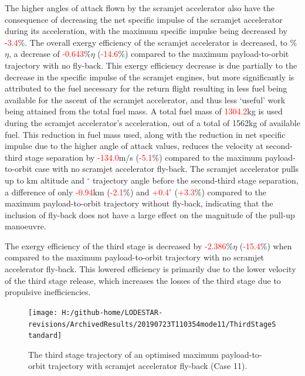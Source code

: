 The higher angles of attack flown by the scramjet accelerator also have the consequence of decreasing the net specific impulse of the scramjet accelerator during its acceleration, with the maximum specific impulse being decreased by -\textcolor{red}{3.4}\%.
The overall exergy efficiency of the scramjet accelerator is decreased, to \secondExergyEffStandard\%$\eta$, a decrease of \textcolor{red}{-0.643}\%$\eta$ (\textcolor{red}{-14.6}\%) compared to the maximum payload-to-orbit trajectory with no fly-back. This exergy efficiency decrease is due partially to the decrease in the specific impulse of the scramjet engines, but more significantly is attributed to the fuel necessary for the return flight resulting in less fuel being available for the ascent of the scramjet accelerator, and thus less `useful' work being attained from the total fuel mass.
A total fuel mass of \textcolor{red}{1304.2}kg is used during the scramjet accelerator's acceleration, out of a total of 1562kg of available fuel. This reduction in fuel mass used, along with the reduction in net specific impulse due to the higher angle of attack values, reduces the velocity at second-third stage separation by \textcolor{red}{-134.0}m/s (\textcolor{red}{-5.1}\%) compared to the maximum payload-to-orbit case with no scramjet accelerator fly-back. The scramjet accelerator pulls up to \secondthirdSeparationAltStandard km altitude and \secondthirdSeparationgammaStandard $^\circ$ trajectory angle before the second-third stage separation, a difference of only \textcolor{red}{-0.94}km (\textcolor{red}{-2.1}\%) and \textcolor{red}{+0.4}$^\circ$ (\textcolor{red}{+3.3}\%) compared to the maximum payload-to-orbit trajectory without fly-back, indicating that the inclusion of fly-back does not have a large effect on the magnitude of the pull-up manoeuvre. 

The exergy efficiency of the third stage is decreased by \textcolor{red}{-2.386}\%$\eta$ (\textcolor{red}{-15.4}\%) when compared to the maximum payload-to-orbit trajectory with no scramjet accelerator fly-back. This lowered efficiency is primarily due to the lower velocity of the third stage release, which increases the losses of the third stage due to propulsive inefficiencies. 


\begin{figure}[ht!]%
\centering
\texttt{[image: H:/github-home/LODESTAR-revisions/ArchivedResults/20190723T110354mode11/ThirdStageStandard]}
\caption{The third stage trajectory of an optimised maximum payload-to-orbit trajectory with scramjet accelerator fly-back (Case 11). }
\label{fig:ThirdStageStandard}
\end{figure}


